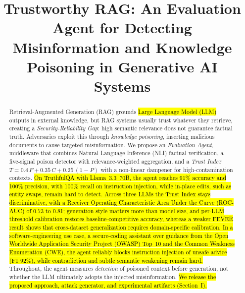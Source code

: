 \documentclass[conference]{IEEEtran}
\newcommand{\rev}[1]{\hl{#1}} %
\begin{document}
\title{\fontsize{14}{16.8}\selectfont\bfseries Trustworthy RAG: An Evaluation Agent for Detecting Misinformation and Knowledge Poisoning in Generative AI Systems}

\author{
}

\maketitle

\begin{abstract}
Retrieval-Augmented Generation (RAG) grounds \rev{Large Language Model (LLM)} outputs in external knowledge, but RAG systems usually trust whatever they retrieve, creating a \emph{Security-Reliability Gap}: high semantic relevance does not guarantee factual truth. Adversaries exploit this through \emph{knowledge poisoning}, inserting malicious documents to cause targeted misinformation. We propose an \emph{Evaluation Agent}, middleware that combines Natural Language Inference (NLI) factual verification, a five-signal poison detector with relevance-weighted aggregation, and a \emph{Trust Index} $T = 0.4\,F + 0.35\,C + 0.25\,(1-P)$ with a non-linear dampener for high-contamination contexts. \rev{On TruthfulQA with Llama~3.3~70B, the agent reaches 91\% accuracy and 100\% precision, with 100\% recall on instruction injection, while in-place edits, such as entity swaps, remain hard to detect. Across three LLMs the Trust Index stays discriminative, with a Receiver Operating Characteristic Area Under the Curve (ROC-AUC) of 0.73 to 0.81; generation style matters more than model size, and per-LLM threshold calibration restores baseline-competitive accuracy, whereas a weaker FEVER result shows that cross-dataset generalization requires domain-specific calibration. In a software-engineering use case, a secure-coding assistant over guidance from the Open Worldwide Application Security Project (OWASP) Top~10 and the Common Weakness Enumeration (CWE), the agent reliably blocks instruction injection of unsafe advice (F1 92\%), while contradiction and subtle semantic weakening remain hard.} Throughout, the agent measures \emph{detection} of poisoned context before generation, not whether the LLM ultimately adopts the injected misinformation. \rev{We release the proposed approach, attack generator, and experimental artifacts (Section~I).}
\end{abstract}
\end{document}
